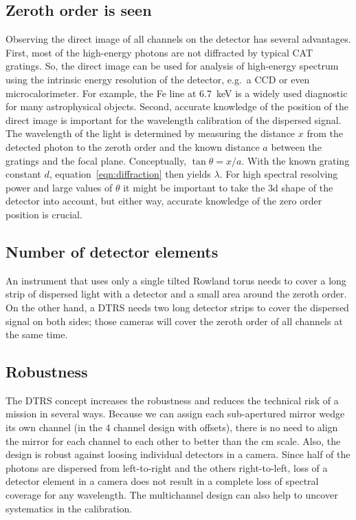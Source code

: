 \documentclass[linenumbers]{aastex631}
\begin{document}
\subsection{Zeroth order is seen}
Observing the direct image of all channels on the detector has several advantages. First, most of the high-energy photons are not diffracted by typical CAT gratings. So, the direct image can be used for analysis of high-energy spectrum using the intrinsic energy resolution of the detector, e.g.\ a CCD or even microcalorimeter. For example, the Fe line at 6.7~keV is a widely used diagnostic for many astrophysical objects. Second, accurate knowledge of the position of the direct image is important for the wavelength calibration of the dispersed signal. The wavelength of the light is determined by measuring the distance $x$ from the detected photon to the zeroth order and the known distance $a$ between the gratings and the focal plane. Conceptually, $\tan \theta = x/a$. With the known grating constant $d$, equation~\ref{eqn:diffraction} then yields $\lambda$. For high spectral resolving power and large values of $\theta$ it might be important to take the 3d shape of the detector into account, but either way, accurate knowledge of the zero order position is crucial.

\subsection{Number of detector elements}
An instrument that uses only a single tilted Rowland torus needs to cover a long strip of dispersed light with a detector and a small area around the zeroth order. On the other hand, a DTRS needs two long detector strips to cover the dispersed signal on both sides; those cameras will cover the zeroth order of all channels at the same time.

\subsection{Robustness}
The DTRS concept increases the robustness and reduces the technical risk of a mission in several ways. Because we can assign each sub-apertured mirror wedge its own channel (in the 4 channel design with offsets), there is no need to align the mirror for each channel to each other to better than the cm scale.
Also, the design is robust against loosing individual detectors in a camera. Since half of the photons are dispersed from left-to-right and the others right-to-left, loss of a detector element in a camera does not result in a complete loss of spectral coverage for any wavelength. The multichannel design can also help to uncover systematics in the calibration.
\end{document}
